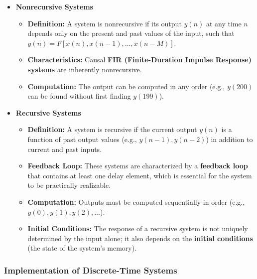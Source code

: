 \begin{itemize}
\item
  \textbf{Nonrecursive Systems}

  \begin{itemize}
  \tightlist
  \item
    \textbf{Definition:} A system is nonrecursive if its output \(y(n)\)
    at any time \(n\) depends only on the present and past values of the
    input, such that \(y(n) = F[x(n), x(n-1), \dots, x(n-M)]\).
  \item
    \textbf{Characteristics:} Causal \textbf{FIR (Finite-Duration
    Impulse Response) systems} are inherently nonrecursive.
  \item
    \textbf{Computation:} The output can be computed in any order (e.g.,
    \(y(200)\) can be found without first finding \(y(199)\)).
  \end{itemize}
\item
  \textbf{Recursive Systems}

  \begin{itemize}
  \tightlist
  \item
    \textbf{Definition:} A system is recursive if the current output
    \(y(n)\) is a function of past output values (e.g.,
    \(y(n-1), y(n-2)\)) in addition to current and past inputs.
  \item
    \textbf{Feedback Loop:} These systems are characterized by a
    \textbf{feedback loop} that contains at least one delay element,
    which is essential for the system to be practically realizable.
  \item
    \textbf{Computation:} Outputs must be computed sequentially in order
    (e.g., \(y(0), y(1), y(2), \dots\)).
  \item
    \textbf{Initial Conditions:} The response of a recursive system is
    not uniquely determined by the input alone; it also depends on the
    \textbf{initial conditions} (the state of the system's memory).
  \end{itemize}
\end{itemize}

\subsubsection{Implementation of Discrete-Time
Systems}\label{implementation-of-discrete-time-systems}


